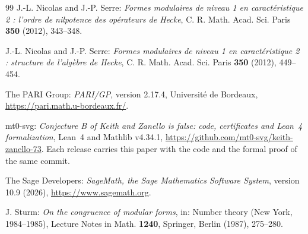 \documentclass[12pt]{amsart}
\theoremstyle{definition}
\begin{document}
\begin{thebibliography}{99}
 J.-L. Nicolas and J.-P. Serre: \emph{Formes modulaires de niveau 1 en caract\'eristique 2 : l'ordre de nilpotence des op\'erateurs de Hecke}, C. R. Math. Acad. Sci. Paris \textbf{350} (2012), 343--348. %

 J.-L. Nicolas and J.-P. Serre: \emph{Formes modulaires de niveau 1 en caract\'eristique 2 : structure de l'alg\`ebre de Hecke}, C. R. Math. Acad. Sci. Paris \textbf{350} (2012), 449--454. %

 The PARI Group: \emph{PARI/GP}, version 2.17.4, Universit\'e de Bordeaux, \url{https://pari.math.u-bordeaux.fr/}.

 mt0-svg: \emph{Conjecture B of Keith and Zanello is false: code, certificates and Lean~4 formalization}, Lean~4 and Mathlib v4.34.1, \url{https://github.com/mt0-svg/keith-zanello-73}. Each release carries this paper with the code and the formal proof of the same commit.

 The Sage Developers: \emph{SageMath, the Sage Mathematics Software System}, version 10.9 (2026), \url{https://www.sagemath.org}.

 J. Sturm: \emph{On the congruence of modular forms}, in: Number theory (New York, 1984--1985), Lecture Notes in Math. \textbf{1240}, Springer, Berlin (1987), 275--280.

\end{thebibliography}
\end{document}
